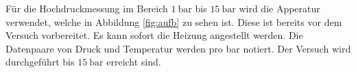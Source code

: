 Für die Hochdruckmessung im Bereich $\SI{1}{\bar}$ bis $\SI{15}{\bar}$ wird die Apperatur verwendet, welche in Abbildung \ref{fig:aufb} zu sehen ist.
Diese ist bereits vor dem Versuch vorbereitet. Es kann sofort die Heizung angestellt werden. Die Datenpaare von Druck und Temperatur werden pro bar notiert. Der Versuch wird durchgeführt bis $\SI{15}{\bar}$ erreicht sind.
